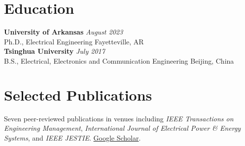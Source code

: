 \documentclass[10pt,letterpaper]{article}
\begin{document}
\section{Education}
\textbf{University of Arkansas} \hfill \textit{August 2023}\\
Ph.D., Electrical Engineering \hfill Fayetteville, AR\\[2pt]
\textbf{Tsinghua University} \hfill \textit{July 2017}\\
B.S., Electrical, Electronics and Communication Engineering \hfill Beijing, China

\section{Selected Publications}
Seven peer-reviewed publications in venues including \textit{IEEE Transactions on Engineering Management}, \textit{International Journal of Electrical Power \& Energy Systems}, and \textit{IEEE JESTIE}. \href{https://scholar.google.com/citations?view_op=list_works&hl=en&user=WdrLhUkAAAAJ&sortby=pubdate}{Google Scholar}.
\end{document}
